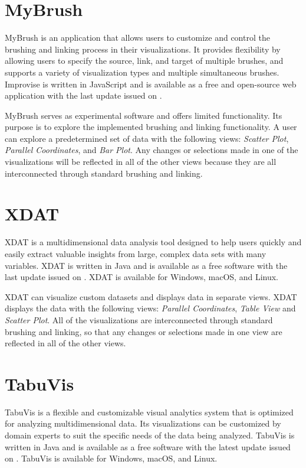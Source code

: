\section{MyBrush}

MyBrush \parencite{koytek2017mybrush} is an application that allows
users to customize and control the brushing and linking process in
their visualizations. It provides flexibility by allowing users to
specify the source, link, and target of multiple brushes, and supports
a variety of visualization types and multiple simultaneous
brushes. Improvise is written in JavaScript and is available as a free
and open-source web application with the last update issued on
.

MyBrush serves as experimental software and offers limited
functionality. Its purpose is to explore the implemented brushing and
linking functionality.  A user can explore a predetermined set of data
with the following views: \emph{Scatter Plot}, \emph{Parallel
Coordinates}, and \emph{Bar Plot}. Any changes or selections made in
one of the visualizations will be reflected in all of the other views
because they are all interconnected through standard brushing and
linking.




\section{XDAT}

XDAT \parencite{XDAT} is a multidimensional data analysis tool
designed to help users quickly and easily extract valuable insights
from large, complex data sets with many variables. XDAT is written in
Java and is available as a free software with the last update issued
on . XDAT is available for Windows, 
macOS, and Linux.

XDAT can visualize custom datasets and displays data in separate
views. XDAT displays the data with the following views: \emph{Parallel
Coordinates}, \emph{Table View} and \emph{Scatter Plot}. All of the
visualizations are interconnected through standard brushing and
linking, so that any changes or selections made in one view are
reflected in all of the other views.



\section{TabuVis}

TabuVis \parencite{nguyen2013tabuvis} is a flexible and customizable
visual analytics system that is optimized for analyzing
multidimensional data. Its visualizations can be customized by domain
experts to suit the specific needs of the data being analyzed. TabuVis
is written in Java and is available as a free software with the latest
update issued on . TabuVis is available for 
Windows, macOS, and Linux.

